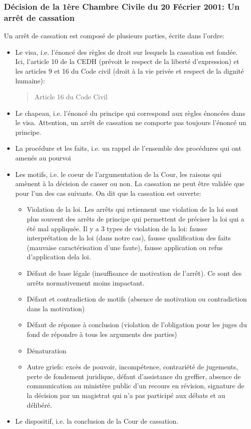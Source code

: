 \documentclass[math]{cours}
\begin{document}
\subsubsection{Décision de la 1ère Chambre Civile du 20 Fécrier 2001: Un arrêt de cassation}
Un arrêt de cassation est composé de plusieurs parties, écrite dans l'ordre:
\begin{itemize}
	\item Le visa, i.e. l'énoncé des règles de droit sur lesquels la cassation est fondée.
	      Ici, l'article 10 de la CEDH (prévoit le respect de la liberté d'expression) et les articles 9 et 16 du Code civil (droit à la vie privée et respect de la dignité humaine):
	      \begin{quote}
		      \begin{flushright}
			      Article 16 du Code Civil
		      \end{flushright}
	      \end{quote}
	\item Le chapeau, i.e. l'énoncé du principe qui correspond aux règles énoncées dans le visa.
	      Attention, un arrêt de cassation ne comporte pas toujours l'énoncé un principe.
	\item La procédure et les faits, i.e. un rappel de l'ensemble des procédures qui ont amenés au pourvoi
	\item Les motifs, i.e. le coeur de l'argumentation de la Cour, les raisons qui amènent à la décision de casser ou non.
	      La cassation ne peut être validée que pour l'un des cas suivants. On dit que la cassation est ouverte:
	      \begin{itemize}
		      \item Violation de la loi. Les arrêts qui retiennent une violation de la loi sont plus souvent des arrêts de principe qui permettent de préciser la loi qui a été mal appliquée.
		            Il y a 3 types de violation de la loi: fausse interprétation de la loi (dans notre cas), fausse qualification des faits (mauvaise caractérisation d'une faute), fausse application ou refus d'application dela loi.
		      \item Défaut de base légale (insuffisance de motivation de l'arrêt).
		            Ce sont des arrêts normativement moins impactant.
		      \item Défaut et contradiction de motifs (absence de motivation ou contradiction dans la motivation)
		      \item Défaut de réponse à conclusion (violation de l'obligation pour les juges du fond de répondre à tous les arguments des parties)
		      \item Dénaturation
		      \item Autre griefs: excès de pouvoir, incompétence, contrariété de jugements, perte de fondement juridique, défaut d'assistance du greffier, absence de communication au ministère public d'un recours en révision, signature de la décision par un magistrat qui n'a pas participé aux débats et au délibéré.
	      \end{itemize}
	\item Le dispositif, i.e. la conclusion de la Cour de cassation.
\end{itemize}
\end{document}
